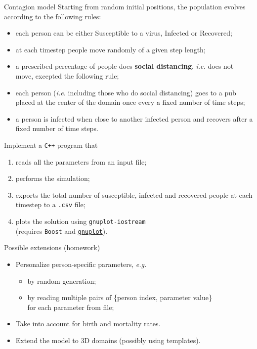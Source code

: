 \documentclass[10pt]{beamer}
\begin{document}
\begin{frame}{Contagion model}
Starting from random initial positions, the population evolves according to the following rules:

\begin{itemize}
    \item each person can be either Susceptible to a virus, Infected or Recovered;
    \item at each timestep people move randomly of a given step length;
    \item a prescribed percentage of people does \textbf{social distancing}, \textit{i.e.} does not move, excepted the following rule;
    \item each person (\textit{i.e.} including those who do social distancing) goes to a pub placed at the center of the domain once every a fixed number of time steps;
    \item a person is infected when close to another infected person and recovers after a fixed number of time steps.
\end{itemize}
\pause
Implement a \texttt{C++} program that
\begin{enumerate}
    \item reads all the parameters from an input file;
    \item performs the simulation;
    \item exports the total number of susceptible, infected and recovered people at each timestep to a \texttt{.csv} file;
    \item plots the solution using \texttt{gnuplot-iostream}\\
          (requires \texttt{Boost} and \href{http://www.gnuplot.info/download.html}{\texttt{gnuplot}}).
\end{enumerate}
\end{frame}

\begin{frame}{Possible extensions (homework)}
\begin{itemize}
    \item Personalize person-specific parameters, \textit{e.g.}
    \begin{itemize}
        \item by random generation;
        \item by reading multiple pairs of \{person index, parameter value\}\\
              for each parameter from file;
    \end{itemize}
    \item Take into account for birth and mortality rates.
    \item Extend the model to 3D domains (possibly using templates).
\end{itemize}
\end{frame}
\end{document}
